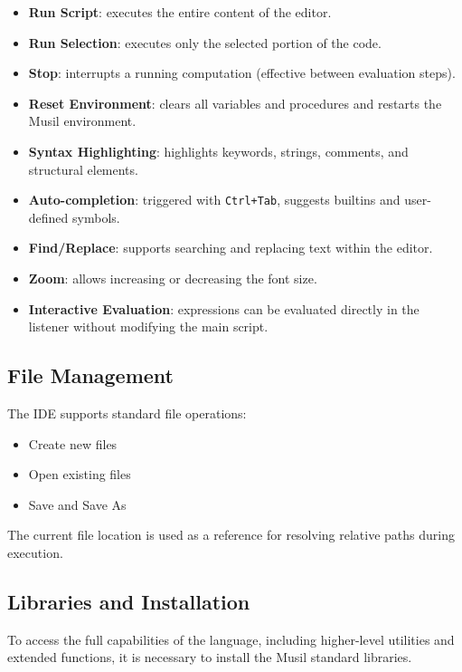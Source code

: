 \documentclass[11pt,a4paper]{article}
\begin{document}
\begin{itemize}
    \item \textbf{Run Script}: executes the entire content of the editor.
    \item \textbf{Run Selection}: executes only the selected portion of the code.
    \item \textbf{Stop}: interrupts a running computation (effective between evaluation steps).
    \item \textbf{Reset Environment}: clears all variables and procedures and restarts the Musil environment.
    \item \textbf{Syntax Highlighting}: highlights keywords, strings, comments, and structural elements.
    \item \textbf{Auto-completion}: triggered with \texttt{Ctrl+Tab}, suggests builtins and user-defined symbols.
    \item \textbf{Find/Replace}: supports searching and replacing text within the editor.
    \item \textbf{Zoom}: allows increasing or decreasing the font size.
    \item \textbf{Interactive Evaluation}: expressions can be evaluated directly in the listener without modifying the main script.
\end{itemize}

\subsection{File Management}

The IDE supports standard file operations:

\begin{itemize}
    \item Create new files
    \item Open existing files
    \item Save and Save As
\end{itemize}

The current file location is used as a reference for resolving relative paths during execution.

\subsection{Libraries and Installation}

To access the full capabilities of the language, including higher-level utilities and extended functions, it is necessary to install the Musil standard libraries.
\end{document}
